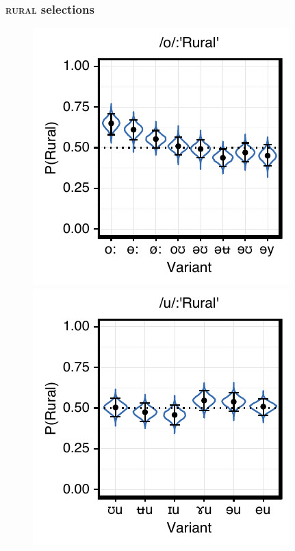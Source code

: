 \documentclass[PWPL]{article}
\begin{document}
\subsubsection{\textsc{rural} selections}
\begin{figure}[H]
\centering
\includegraphics[scale=0.8]{ow_local.pdf}
\includegraphics[scale=0.8]{uw_local.pdf}
\end{figure}
\end{document}
